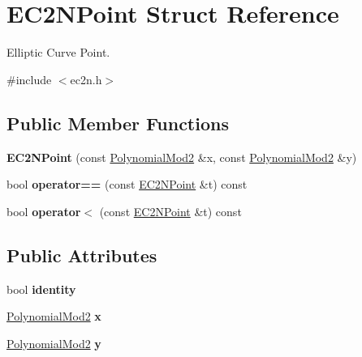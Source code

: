 \hypertarget{struct_e_c2_n_point}{
\section{EC2NPoint Struct Reference}
\label{struct_e_c2_n_point}
}


Elliptic Curve Point.  


{\ttfamily \#include $<$ec2n.h$>$}\subsection*{Public Member Functions}
\begin{DoxyCompactItemize}
\item 
\hypertarget{struct_e_c2_n_point_a7ea8ec548d653530054aeb9c4c54e24d}{
{\bfseries EC2NPoint} (const \hyperlink{class_polynomial_mod2}{PolynomialMod2} \&x, const \hyperlink{class_polynomial_mod2}{PolynomialMod2} \&y)}
\label{struct_e_c2_n_point_a7ea8ec548d653530054aeb9c4c54e24d}

\item 
\hypertarget{struct_e_c2_n_point_a0559dcd6748b0b1ab727d59a59b51dbf}{
bool {\bfseries operator==} (const \hyperlink{struct_e_c2_n_point}{EC2NPoint} \&t) const }
\label{struct_e_c2_n_point_a0559dcd6748b0b1ab727d59a59b51dbf}

\item 
\hypertarget{struct_e_c2_n_point_af6b871137539ef366167997d0aa2da90}{
bool {\bfseries operator$<$} (const \hyperlink{struct_e_c2_n_point}{EC2NPoint} \&t) const }
\label{struct_e_c2_n_point_af6b871137539ef366167997d0aa2da90}

\end{DoxyCompactItemize}
\subsection*{Public Attributes}
\begin{DoxyCompactItemize}
\item 
\hypertarget{struct_e_c2_n_point_a6ded60d603c7ba5af13c7ba3da253cf7}{
bool {\bfseries identity}}
\label{struct_e_c2_n_point_a6ded60d603c7ba5af13c7ba3da253cf7}

\item 
\hypertarget{struct_e_c2_n_point_ab90a3edb6b82f616b6a281315289c574}{
\hyperlink{class_polynomial_mod2}{PolynomialMod2} {\bfseries x}}
\label{struct_e_c2_n_point_ab90a3edb6b82f616b6a281315289c574}

\item 
\hypertarget{struct_e_c2_n_point_a0ef74f2187b87841db0c36fef978f387}{
\hyperlink{class_polynomial_mod2}{PolynomialMod2} {\bfseries y}}
\label{struct_e_c2_n_point_a0ef74f2187b87841db0c36fef978f387}

\end{DoxyCompactItemize}


